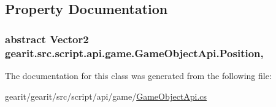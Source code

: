 \subsection{Property Documentation}
\hypertarget{classgearit_1_1src_1_1script_1_1api_1_1game_1_1_game_object_api_abb4b5c17a9920fc1be3049d6a5142b06}{
\subsubsection[{Position}]{\setlength{\rightskip}{0pt plus 5cm}abstract Vector2 gearit.\+src.\+script.\+api.\+game.\+Game\+Object\+Api.\+Position\hspace{0.3cm}{\ttfamily [get]}, {\ttfamily [set]}}}\label{classgearit_1_1src_1_1script_1_1api_1_1game_1_1_game_object_api_abb4b5c17a9920fc1be3049d6a5142b06}


The documentation for this class was generated from the following file\+:\begin{DoxyCompactItemize}
\item 
gearit/gearit/src/script/api/game/\hyperlink{_game_object_api_8cs}{Game\+Object\+Api.\+cs}\end{DoxyCompactItemize}
